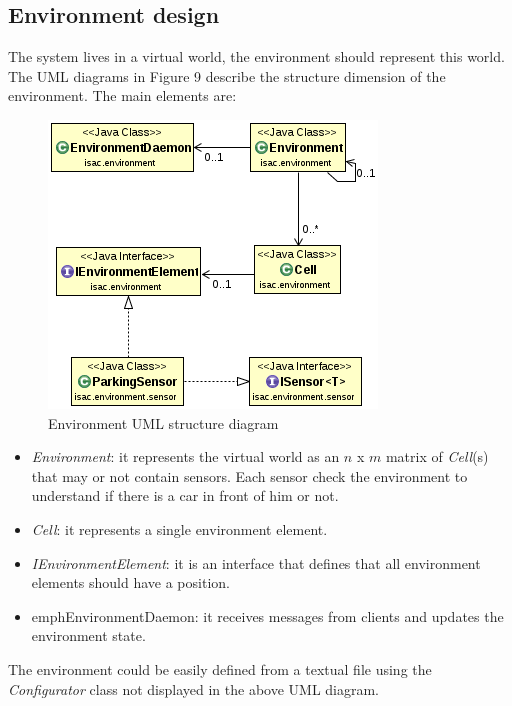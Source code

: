 \documentclass[11pt]{article}
\begin{document}
\subsection{Environment design}
The system lives in a virtual world, the environment should represent this world. The UML diagrams in Figure 9 describe the structure dimension of the environment. The main elements are:
\begin{figure}
  \centering
	\includegraphics[scale=0.8]{environmentUML}
  \caption{Environment UML structure diagram}
\end{figure}
\begin{itemize}
\item \emph{Environment}: it represents the virtual world as an $n$ x $m$ matrix of \emph{Cell}(s) that may or not contain sensors. Each sensor check the environment to understand if there is a car in front of him or not.
\item \emph{Cell}: it represents a single environment element. 
\item \emph{IEnvironmentElement}: it is an interface that defines that all environment elements should have a position.
\item emph{EnvironmentDaemon}: it receives messages from clients and updates the environment state.
\end{itemize}
The environment could be easily defined from a textual file using the \emph{Configurator} class not displayed in the above UML diagram.
\end{document}
